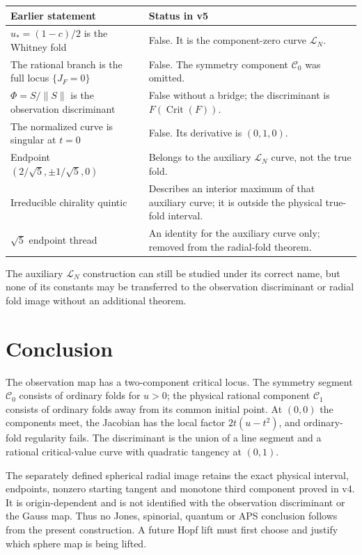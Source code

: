 \documentclass[11pt]{article}
\theoremstyle{definition}
\newcommand{\LN}{\mathcal L_N}
\newcommand{\Csym}{\mathcal C_0}
\newcommand{\Crat}{\mathcal C_1}
\begin{document}
\begin{center}
\begin{tabular}{@{}p{}p{}@{}}
\toprule
Earlier statement & Status in v5\\
\midrule
$u_*=(1-c)/2$ is the Whitney fold
& False.  It is the component-zero curve $\LN$.\\
The rational branch is the full locus $\{J_F=0\}$
& False.  The symmetry component $\Csym$ was omitted.\\
$\Phi=S/\lVert S\rVert$ is the observation discriminant
& False without a bridge; the discriminant is $F(\operatorname{Crit}(F))$.\\
The normalized curve is singular at $t=0$
& False.  Its derivative is $(0,1,0)$.\\
Endpoint $(2/\sqrt5,\pm1/\sqrt5,0)$
& Belongs to the auxiliary $\LN$ curve, not the true fold.\\
Irreducible chirality quintic
& Describes an interior maximum of that auxiliary curve; it is outside the
  physical true-fold interval.\\
$\sqrt5$ endpoint thread
& An identity for the auxiliary curve only; removed from the radial-fold
  theorem.\\
\bottomrule
\end{tabular}
\end{center}

The auxiliary $\LN$ construction can still be studied under its correct
name, but none of its constants may be transferred to the observation
discriminant or radial fold image without an additional theorem.

\section{Conclusion}

The observation map has a two-component critical locus.  The symmetry segment
$\Csym$ consists of ordinary folds for $u>0$; the physical rational component
$\Crat$ consists of ordinary folds away from its common initial point.  At
$(0,0)$ the components meet, the Jacobian has the local factor
$2t(u-t^2)$, and ordinary-fold regularity fails.  The discriminant is the
union of a line segment and a rational critical-value curve with quadratic
tangency at $(0,1)$.

The separately defined spherical radial image retains the exact physical
interval, endpoints, nonzero starting tangent and monotone third component
proved in v4.  It is origin-dependent and is not identified with the
observation discriminant or the Gauss map.  Thus no Jones, spinorial, quantum
or APS conclusion follows from the present construction.  A future Hopf lift
must first choose and justify which sphere map is being lifted.
\end{document}
